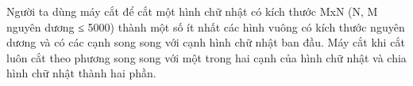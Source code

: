 Người ta dùng máy cắt để cắt một hình chữ nhật có kích thước MxN (N, M nguyên dương ≤ 5000) thành một số ít nhất các hình vuông có kích thước nguyên dương và có các cạnh song song với cạnh hình chữ nhật ban đầu. Máy cắt khi cắt luôn cắt theo phương song song với một trong hai cạnh của hình chữ nhật và chia hình chữ nhật thành hai phần.  

\